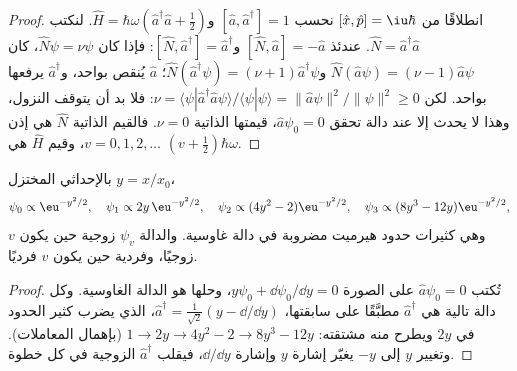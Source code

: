 \begin{proof}
انطلاقًا من $[\hat x,\hat p] = \iu\hbar$ نحسب $[\hat a,\hat a^\dagger] = 1$ 
و$\hat H = \hbar\omega(\hat a^\dagger\hat a + \frac12)$. لنكتب $\hat N =
\hat a^\dagger\hat a$. عندئذ $[\hat N,\hat a] = -\hat a$ و$[\hat N,\hat
a^\dagger] = \hat a^\dagger$: فإذا كان $\hat N\psi = \nu\psi$، كان $\hat N(\hat
a\psi) = (\nu - 1)\hat a\psi$ و$\hat N(\hat a^\dagger\psi) = (\nu + 1)\hat
a^\dagger\psi$؛  $\hat a$ يُنقص  بواحد، و$\hat a^\dagger$ يرفعها
بواحد. لكن $\nu = \langle\psi|\hat a^\dagger\hat a\psi\rangle/\langle\psi|\psi
\rangle = \|\hat a\psi\|^2/\|\psi\|^2 \ge 0$: فلا بد أن يتوقف النزول، وهذا
لا يحدث إلا عند دالة تحقق $\hat a\psi_0 = 0$، قيمتها الذاتية $\nu = 0$.
فالقيم الذاتية  $\hat N$ هي إذن $v = 0, 1, 2, \dots$، وقيم
$\hat H$ هي $(v + \frac12)\hbar\omega$.
\end{proof}

\begin{proposition}\label{prop:b3:quantum-model-systems:oscillator-functions}
بالإحداثي المختزل $y = x/x_0$،
\[
\psi_0 \propto \eu^{-y^2/2}, \quad \psi_1 \propto 2y\,\eu^{-y^2/2}, \quad
\psi_2 \propto (4y^2 - 2)\eu^{-y^2/2}, \quad \psi_3 \propto (8y^3 -
12y)\eu^{-y^2/2},
\]
وهي كثيرات حدود هيرميت مضروبة في دالة غاوسية. والدالة $\psi_v$ زوجية حين يكون $v$ زوجيًا،
وفردية حين يكون $v$ فرديًا.
\end{proposition}

\begin{proof}
تُكتب $\hat a\psi_0 = 0$ على الصورة $y\psi_0 + \dd\psi_0/\dd y = 0$، وحلها هو
الدالة الغاوسية. وكل دالة تالية هي $\hat a^\dagger$ مطبَّقًا على سابقتها،
$\hat a^\dagger = \frac{1}{\sqrt2}(y - \dd/\dd y)$، الذي يضرب
كثير الحدود في $2y$ ويطرح منه مشتقته: $1 \to 2y \to 4y^2 - 2 \to
8y^3 - 12y$ (بإهمال المعاملات). وتغيير $y$ إلى $-y$ يغيّر إشارة $y$
وإشارة $\dd/\dd y$، فيقلب $\hat a^\dagger$ الزوجية في كل خطوة.
\end{proof}

